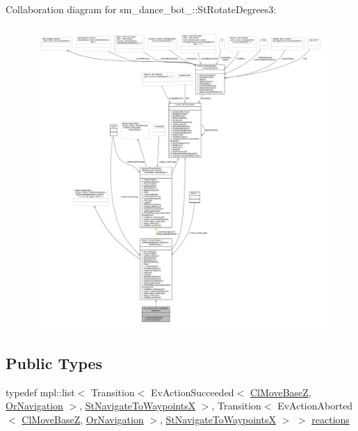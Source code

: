 Collaboration diagram for sm\+\_\+dance\+\_\+bot\+\_\+:\+:St\+Rotate\+Degrees3\+:
\nopagebreak
\begin{figure}[H]
\begin{center}
\leavevmode
\includegraphics[width=350pt]{structsm__dance__bot__3_1_1StRotateDegrees3__coll__graph}
\end{center}
\end{figure}
\subsection*{Public Types}
\begin{DoxyCompactItemize}
\item 
typedef mpl\+::list$<$ Transition$<$ Ev\+Action\+Succeeded$<$ \hyperlink{classmove__base__z__client_1_1ClMoveBaseZ}{Cl\+Move\+BaseZ}, \hyperlink{classsm__dance__bot__3_1_1OrNavigation}{Or\+Navigation} $>$, \hyperlink{structsm__dance__bot__3_1_1StNavigateToWaypointsX}{St\+Navigate\+To\+WaypointsX} $>$, Transition$<$ Ev\+Action\+Aborted$<$ \hyperlink{classmove__base__z__client_1_1ClMoveBaseZ}{Cl\+Move\+BaseZ}, \hyperlink{classsm__dance__bot__3_1_1OrNavigation}{Or\+Navigation} $>$, \hyperlink{structsm__dance__bot__3_1_1StNavigateToWaypointsX}{St\+Navigate\+To\+WaypointsX} $>$ $>$ \hyperlink{structsm__dance__bot__3_1_1StRotateDegrees3_a4aa78aeefcd35680008136a2b29df986}{reactions}
\end{DoxyCompactItemize}
